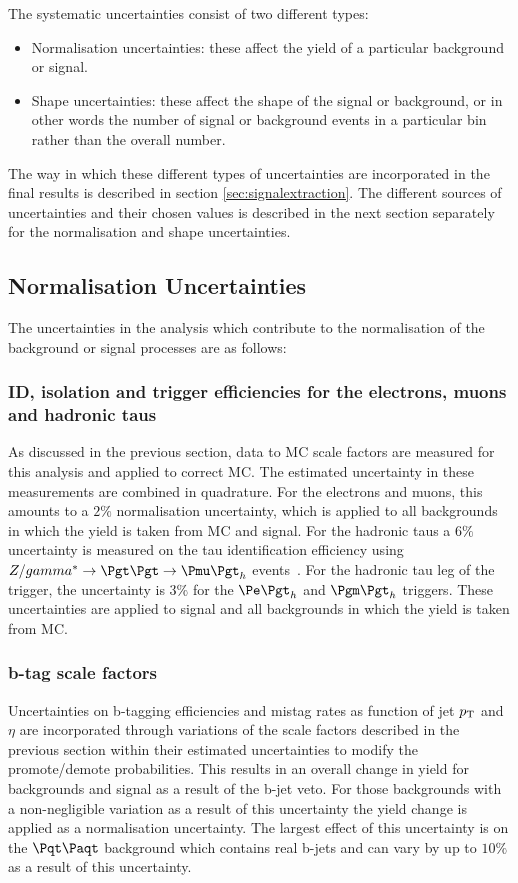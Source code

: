 The systematic uncertainties consist of two different types:

\begin{itemize} 
\item Normalisation uncertainties: these affect the yield of a particular background or
signal.
\item Shape uncertainties: these affect the shape of the signal or background, or in
other words the number of signal or background events in a particular bin rather
than the overall number.
\end{itemize}

The way in which these different types of uncertainties are incorporated in the
final results is described in section \ref{sec:signalextraction}. The different
sources of uncertainties and their chosen values is described in the next
section separately for the normalisation and shape uncertainties.

\subsection{Normalisation Uncertainties}
\label{sec:systematicUncertainties_yield}

The uncertainties in the analysis which contribute to the normalisation of the
background or signal processes are as follows:

\subsubsection{\textbf{ID, isolation and trigger efficiencies for the electrons, muons and
hadronic taus}}
As discussed in the previous section, data to MC scale factors are measured for this 
analysis and applied to correct \ac{MC}. The estimated uncertainty in these
measurements are combined in quadrature. For the electrons and muons, this
amounts to a $2\%$ normalisation uncertainty, which is applied to all
backgrounds in which the yield is taken from MC and signal.
For the hadronic taus a $6\%$ uncertainty
is measured on the tau identification efficiency using 
$Z/\gamma^{*} \to \Pgt\Pgt \to \Pmu\Pgt_{h}$ events~\cite{Chatrchyan:2012zz}. 
For the hadronic tau leg of the trigger, the
uncertainty is $3\%$ for the $\etau$ and $\mutau$ triggers.
These uncertainties are applied to signal and all backgrounds in which the yield
is taken from \ac{MC}.

\subsubsection{\textbf{b-tag scale factors}} 
Uncertainties on b-tagging efficiencies and mistag rates as function of jet
$p_{\mathrm{T}}$ and $\eta$ are incorporated through variations of the scale factors
described in the previous section within their estimated uncertainties to modify
the promote/demote probabilities. This results in an overall change in yield for
backgrounds and signal as a result of the b-jet veto. For those backgrounds
with a non-negligible variation as a result of this uncertainty the yield change
is applied as a normalisation uncertainty. The largest effect of this
uncertainty is on the $\ttbar$ background which contains real b-jets and can
vary by up to $10\%$ as a result of this uncertainty.

